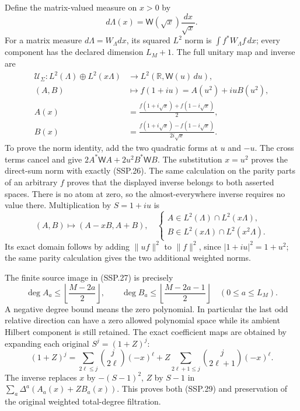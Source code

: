 Define the matrix-valued measure on \(x>0\) by
\[
 d\Lambda(x)=\mathsf W(\sqrt x)\frac{dx}{\sqrt x}.
 \tag{SSP.26}
\]
For a matrix measure \(d\Lambda=W_\Lambda dx\), its squared \(L^2\)
norm is \(\int f^*W_\Lambda f\,dx\); every component has the
declared dimension \(L_M+1\).
The full unitary map and inverse are
\[
 \begin{aligned}
 \mathcal U_\Sigma:
 L^2(\Lambda)\oplus L^2(x\Lambda)
 &\longrightarrow L^2(\mathbb R,\mathsf W(u)\,du),\\
 (A,B)&\longmapsto f(1+iu)=A(u^2)+iuB(u^2),\\
 A(x)&=\frac{f(1+i\sqrt x)+f(1-i\sqrt x)}2,\\
 B(x)&=\frac{f(1+i\sqrt x)-f(1-i\sqrt x)}{2i\sqrt x}.
 \end{aligned}                                                    \tag{SSP.27}
\]
To prove the norm identity, add the two quadratic forms at
\(u\) and \(-u\).  The cross terms cancel and give
\(2A^*\mathsf W A+2u^2B^*\mathsf W B\).
The substitution \(x=u^2\) proves the direct-sum norm with
exactly (SSP.26).  The same calculation on the parity parts
of an arbitrary \(f\) proves that the displayed inverse belongs
to both asserted spaces.  There is no atom at zero, so the
almost-everywhere inverse requires no value there.
Multiplication by \(S=1+iu\) is
\[
 (A,B)\longmapsto(A-xB,A+B),
 \quad
 \begin{cases}
 A\in L^2(\Lambda)\cap L^2(x\Lambda),\\
 B\in L^2(x\Lambda)\cap L^2(x^2\Lambda).
 \end{cases}                                                       \tag{SSP.28}
\]
Its exact domain follows by adding \(\|uf\|^2\) to
\(\|f\|^2\), since \(|1+iu|^2=1+u^2\); the same parity
calculation gives the two additional weighted norms.

The finite source image in (SSP.27) is precisely
\[
 \deg A_a\le\left\lfloor\frac{M-2a}{2}\right\rfloor,\qquad
 \deg B_a\le\left\lfloor\frac{M-2a-1}{2}\right\rfloor
 \quad(0\le a\le L_M).
 \tag{SSP.29}
\]
A negative degree bound means the zero polynomial.
In particular the last odd relative direction can have a zero
allowed polynomial space while its ambient Hilbert component
is still retained.  The exact coefficient maps are obtained by
expanding each original \(S^j=(1+Z)^j\):
\[
 (1+Z)^j=
 \sum_{2\ell\le j}\binom j{2\ell}(-x)^\ell+
 Z\sum_{2\ell+1\le j}\binom j{2\ell+1}(-x)^\ell.
 \tag{SSP.30}
\]
The inverse replaces \(x\) by \(-(S-1)^2\), \(Z\) by \(S-1\)
in \(\sum_a\Delta^a(A_a(x)+ZB_a(x))\).
This proves both (SSP.29) and preservation of the original
weighted total-degree filtration.

